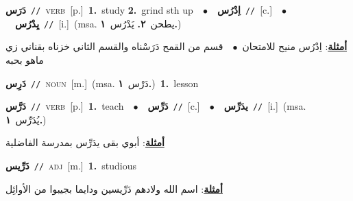 \documentclass[10pt,a4paper,twoside]{article} %
\begin{document}
\begin{multicols}{2}
{\setlength\topsep{0pt}\textbf{\foreignlanguage{arabic}{دَرَس}}\ {\color{gray}\texttt{//}\color{black}}\ \textsc{verb}\ [p.]\ \textbf{1.}~study  \textbf{2.}~grind sth up\ \ $\bullet$\ \ \setlength\topsep{0pt}\textbf{\foreignlanguage{arabic}{اِدْرُس}}\ {\color{gray}\texttt{//}\color{black}}\ [c.]\ \ $\bullet$\ \ \setlength\topsep{0pt}\textbf{\foreignlanguage{arabic}{يِدْرُس}}\ {\color{gray}\texttt{//}\color{black}}\ [i.]\ \color{gray}(msa. \foreignlanguage{arabic}{يطحن}~\foreignlanguage{arabic}{\textbf{٢.}}  \foreignlanguage{arabic}{يَدْرُس}~\foreignlanguage{arabic}{\textbf{١.}})\color{black}\  \begin{flushright}\color{gray}\foreignlanguage{arabic}{\textbf{\underline{\foreignlanguage{arabic}{أمثلة}}}: اِدْرُس منيح للامتحان\ $\bullet$\ \  قسم من القمح دَرَسْناه والقسم الثاني خزناه بقناني زي ماهو بحبه}\end{flushright}\color{black}} \vspace{2mm}

{\setlength\topsep{0pt}\textbf{\foreignlanguage{arabic}{دَرِس}}\ {\color{gray}\texttt{//}\color{black}}\ \textsc{noun}\ [m.]\ \color{gray}(msa. \foreignlanguage{arabic}{دَرْس}~\foreignlanguage{arabic}{\textbf{١.}})\color{black}\ \textbf{1.}~lesson\ } \vspace{2mm}

{\setlength\topsep{0pt}\textbf{\foreignlanguage{arabic}{دَرَّس}}\ {\color{gray}\texttt{//}\color{black}}\ \textsc{verb}\ [p.]\ \textbf{1.}~teach\ \ $\bullet$\ \ \setlength\topsep{0pt}\textbf{\foreignlanguage{arabic}{دَرِّس}}\ {\color{gray}\texttt{//}\color{black}}\ [c.]\ \ $\bullet$\ \ \setlength\topsep{0pt}\textbf{\foreignlanguage{arabic}{يدَرِّس}}\ {\color{gray}\texttt{//}\color{black}}\ [i.]\ \color{gray}(msa. \foreignlanguage{arabic}{يُدَرِّس}~\foreignlanguage{arabic}{\textbf{١.}})\color{black}\  \begin{flushright}\color{gray}\foreignlanguage{arabic}{\textbf{\underline{\foreignlanguage{arabic}{أمثلة}}}: أبوي بقى يدَرِّس بمدرسة الفاضلية}\end{flushright}\color{black}} \vspace{2mm}

{\setlength\topsep{0pt}\textbf{\foreignlanguage{arabic}{دَرِّيس}}\ {\color{gray}\texttt{//}\color{black}}\ \textsc{adj}\ [m.]\ \textbf{1.}~studious\  \begin{flushright}\color{gray}\foreignlanguage{arabic}{\textbf{\underline{\foreignlanguage{arabic}{أمثلة}}}: اسم الله ولادهم دَرِّيسين ودايما بجيبوا من الأوائِل}\end{flushright}\color{black}} \vspace{2mm}


\end{multicols}
\end{document}

